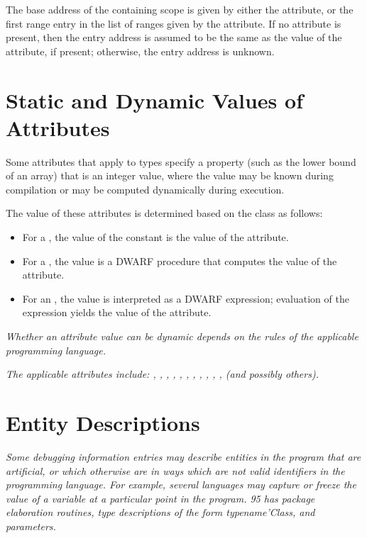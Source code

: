 The base address of the containing scope is given by either the
\DWATlowpc{} attribute, or the first range entry in the list of
ranges given by the \DWATranges{} attribute. 
If no \DWATentrypcNAME{} attribute is present,
then the entry address is assumed to be the same as the
value of the \DWATlowpc{} attribute, if present; otherwise,
the entry address is unknown.

\section{Static and Dynamic Values of Attributes}
\label{chap:staticanddynamicvaluesofattributes}

Some attributes that apply to types specify a property (such
as the lower bound of an array) that is an integer value,
where the value may be known during compilation or may be
computed dynamically during execution.

The value of these
attributes is determined based on the class as follows:
\begin{itemize}
\item For a , the value of the constant is the value of
the attribute.

\item For a , the
value is a DWARF procedure that computes the value of the attribute.

\item For an , the value is interpreted as a 
DWARF expression; 
evaluation of the expression yields the value of
the attribute.
\end{itemize}

\textit{%
Whether an attribute value can be dynamic depends on the
rules of the applicable programming language.
}

\textit{The applicable attributes include: 
\DWATallocated,
\DWATassociated, 
\DWATbitoffset, 
\DWATbitsize,
\DWATbitstride,
\DWATbytesize,
\DWATbytestride, 
\DWATcount, 
\DWATlowerbound,
\DWATrank,
\DWATupperbound,
(and possibly others).}

\section{Entity Descriptions}
\textit{Some debugging information entries may describe entities
in the program that are artificial, or which otherwise are
 in ways which are not valid identifiers in the
programming language. For example, several languages may
capture or freeze the value of a variable at a particular
point in the program. 
 95 has package elaboration routines,
type descriptions of the form typename\textquoteright Class, and 
 parameters.  }

